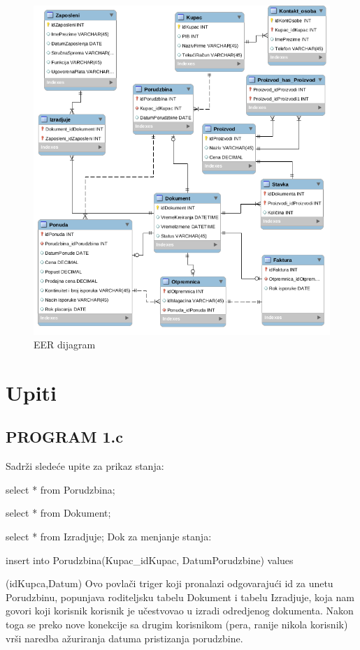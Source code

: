 \clearpage

\begin{figure}[ht]
\centering
\includegraphics[width=160mm]{slike/er.png}%
\caption{EER dijagram}
\end{figure}

\clearpage

\section{Upiti}

\subsection{PROGRAM 1.c}
Sadrži sledeće upite za prikaz stanja:

select * from Porudzbina;

select * from Dokument;

select * from Izradjuje;
\newline
Dok za menjanje stanja:

insert into Porudzbina(Kupac\_idKupac, DatumPorudzbine) values

(idKupca,Datum)
\newline
Ovo povlači triger koji pronalazi odgovarajući id za unetu Porudzbinu, popunjava roditeljsku tabelu Dokument i tabelu Izradjuje, koja nam govori koji korisnik korisnik je učestvovao u izradi odredjenog dokumenta.
\newline
Nakon toga se preko nove konekcije sa drugim korisnikom (pera, ranije nikola korisnik) vrši naredba ažuriranja datuma pristizanja porudzbine.

